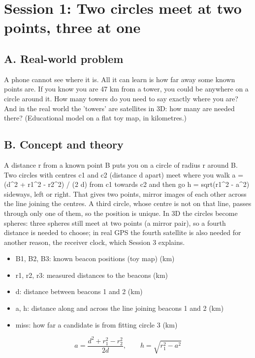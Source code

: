 \documentclass[11pt,a4paper]{article}
\begin{document}
\section{Session 1: Two circles meet at two points, three at one}

\subsection*{A. Real-world problem}
A phone cannot see where it is. All it can learn is how far away some known points are. If you know you are 47 km from a tower, you could be anywhere on a circle around it. How many towers do you need to say exactly where you are? And in the real world the 'towers' are satellites in 3D: how many are needed there? (Educational model on a flat toy map, in kilometres.)

\subsection*{B. Concept and theory}
A distance r from a known point B puts you on a circle of radius r around B. Two circles with centres c1 and c2 (distance d apart) meet where you walk a = (d\textasciicircum{}2 + r1\textasciicircum{}2 - r2\textasciicircum{}2) / (2 d) from c1 towards c2 and then go h = sqrt(r1\textasciicircum{}2 - a\textasciicircum{}2) sideways, left or right. That gives two points, mirror images of each other across the line joining the centres. A third circle, whose centre is not on that line, passes through only one of them, so the position is unique. In 3D the circles become spheres: three spheres still meet at two points (a mirror pair), so a fourth distance is needed to choose; in real GPS the fourth satellite is also needed for another reason, the receiver clock, which Session 3 explains.

\begin{itemize}[nosep]
\item B1, B2, B3: known beacon positions (toy map) (km)
\item r1, r2, r3: measured distances to the beacons (km)
\item d: distance between beacons 1 and 2 (km)
\item a, h: distance along and across the line joining beacons 1 and 2 (km)
\item miss: how far a candidate is from fitting circle 3 (km)
\end{itemize}

\begin{equation*}
a=\frac{d^2+r_1^2-r_2^2}{2d},\qquad h=\sqrt{r_1^2-a^2}
\end{equation*}
\end{document}
